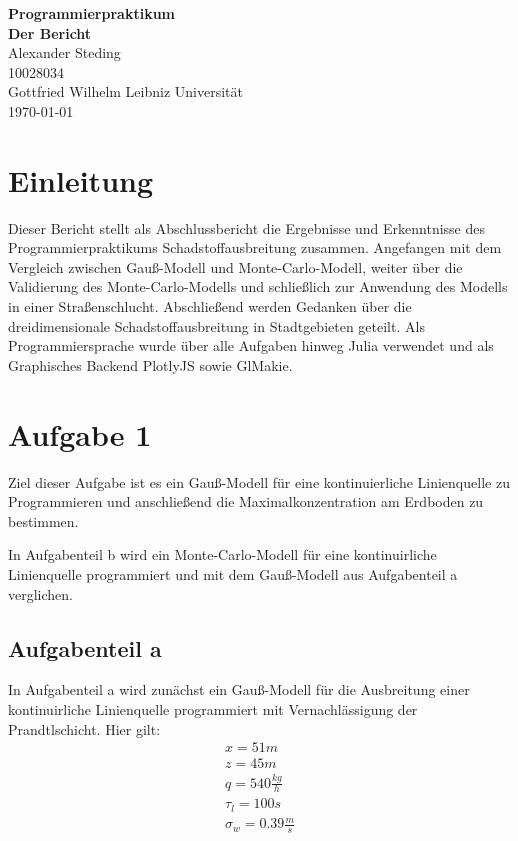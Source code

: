 \documentclass[ngerman]{scrartcl}
\newcommand{\authA}{Alexander Steding}
\begin{document}



\begin{titlepage}
\begin{center}
\vspace{3cm}
{\fontsize{40}{49} \selectfont \textbf{Programmierpraktikum}}\\[2cm]
{\fontsize{40}{49} \selectfont \textbf{Der Bericht}}\\[2cm]
\Large{\authA }\\
\Large{10028034 }\\
\large{Gottfried Wilhelm Leibniz Universität\\{\today}}
\end{center}
\end{titlepage}

\newpage
\tableofcontents
\newpage
\section{Einleitung }
Dieser Bericht stellt als Abschlussbericht die Ergebnisse und Erkenntnisse des Programmierpraktikums Schadstoffausbreitung zusammen. Angefangen mit dem Vergleich zwischen Gauß-Modell und Monte-Carlo-Modell, weiter über die Validierung des Monte-Carlo-Modells und schließlich zur Anwendung des Modells in einer Straßenschlucht. Abschließend werden Gedanken über die dreidimensionale Schadstoffausbreitung  in Stadtgebieten geteilt. Als Programmiersprache wurde über alle Aufgaben hinweg Julia verwendet und als Graphisches Backend PlotlyJS sowie GlMakie.
\section{Aufgabe  1}
Ziel dieser Aufgabe ist es ein Gauß-Modell für eine kontinuierliche Linienquelle zu Programmieren und anschließend die Maximalkonzentration am Erdboden zu bestimmen.

In Aufgabenteil b wird ein Monte-Carlo-Modell für eine kontinuirliche Linienquelle programmiert und mit dem Gauß-Modell aus Aufgabenteil a verglichen.
\subsection{Aufgabenteil a}
In Aufgabenteil a wird zunächst ein Gauß-Modell für die Ausbreitung einer kontinuirliche Linienquelle programmiert mit Vernachlässigung der Prandtlschicht. 
Hier gilt:
\begin{align}
x= 51 \si{m} \\
z= 45 \si{m} \\
q= 540 \frac{\si{kg}}{\si{h}}\\
\tau_{l} =100 \si{s}\\
\sigma_{w}=0.39 \frac{\si{m}}{\si{s}}\\
\end{align}
\end{document}
